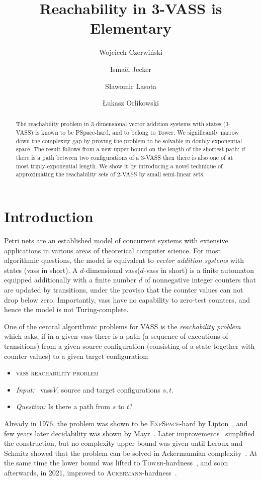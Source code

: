 \documentclass[a4paper, UKenglish, cleveref, autoref, thm-restate]{lipics-v2021}
\title{Reachability in 3-VASS is Elementary}
\author{Wojciech Czerwi\'nski}
{University of Warsaw}
{wczerwin@mimuw.edu.pl}
{https://orcid.org/0000-0002-6169-868X}
{Supported by the ERC grant INFSYS, agreement no. 950398.}
\author{Isma{\"e}l Jecker}
{FEMTO-ST, CNRS, Univ. Franche-Comté, France}
{ismael.jecker@gmail.com}
{}
{}
\author{Sławomir Lasota}
{University of Warsaw}
{s.lasota@uw.edu.pl}
{https://orcid.org/0000-0001-8674-4470}
{Supported by the ERC grant INFSYS, agreement no. 950398 and by the NCN grant 2021/41/B/ST6/00535.}
\author{Łukasz Orlikowski}
{University of Warsaw}
{l.orlikowski@mimuw.edu.pl}
{https://orcid.org/0009-0001-4727-2068}
{Supported by the ERC grant INFSYS, agreement no. 950398.}
\newcommand{\expspace}{\textsc{ExpSpace}\xspace}
\newcommand{\tower}{\textsc{Tower}\xspace}
\newcommand{\ackermann}{\textsc{Ackermann}\xspace}
\newcommand{\vass}{{\sc vass}\xspace}
\newcommand{\parvass}[1]{{$#1$-\vass}\xspace}
\newcommand{\probdef}[3]{
\begin{itemize} 
\item[] \textsc{#1}
    \item[] \textit{Input:} \quad\, #2.
    \item[] \textit{Question:} #3?
\end{itemize}
}
\begin{document}
\maketitle

\begin{abstract}
The reachability problem in 3-dimensional vector addition systems with states (3-VASS) is known to be PSpace-hard, and to belong to Tower. We significantly narrow down the complexity gap by proving the problem to be solvable in doubly-exponential space.
The result follows from a new upper bound on the length of the shortest path:
if there is a path between two configurations of a 3-VASS then there is also one of at most triply-exponential length.
We show it by introducing a novel technique of approximating the reachability sets of 2-VASS by small semi-linear sets.
\end{abstract}


\maketitle



\section{Introduction}\label{sec:intro}

Petri nets are an established model of concurrent systems with extensive applications in various
areas of theoretical computer science.
For most algorithmic questions, the model is equivalent to
\emph{vector addition systems} with states (\vass in short).
A $d$-dimensional \vass (\parvass d in short) is a finite automaton equipped additionally
with a finite number $d$ of nonnegative integer counters that are updated by
transitions, under the proviso that the counter values can not drop below zero.
Importantly, \vass have no capability to zero-test counters, and hence the model is not Turing-complete. 

One of the central algorithmic problems for VASS is the \emph{reachability problem} which asks,
if in a given \vass there is a path (a sequence of executions of transitions) 
from a given source configuration (consisting of a 
state together with counter values) to a given target configuration:

\probdef{\vass reachability problem}
{\vass $V$, source and target configurations $s, t$}
{Is there a path from $s$ to $t$}

\noindent
Already in 1976, the problem was shown to be \expspace-hard by Lipton~\cite{Lipton76}, and
few years later decidability was shown by Mayr~\cite{Mayr81}.
Later improvements~\cite{DBLP:conf/stoc/Kosaraju82,DBLP:journals/tcs/Lambert92} simplified the construction, 
but no complexity upper bound was given until Leroux and Schmitz showed that the problem 
can be solved in Ackermannian complexity~\cite{LerouxS15,LS19}.
At the same time the lower bound was lifted to \tower-hardness~\cite{CzerwinskiLLLM21}, and soon
afterwards, in 2021, improved to \ackermann-hardness~\cite{DBLP:conf/focs/Leroux21,DBLP:conf/focs/CzerwinskiO21}.
\end{document}
